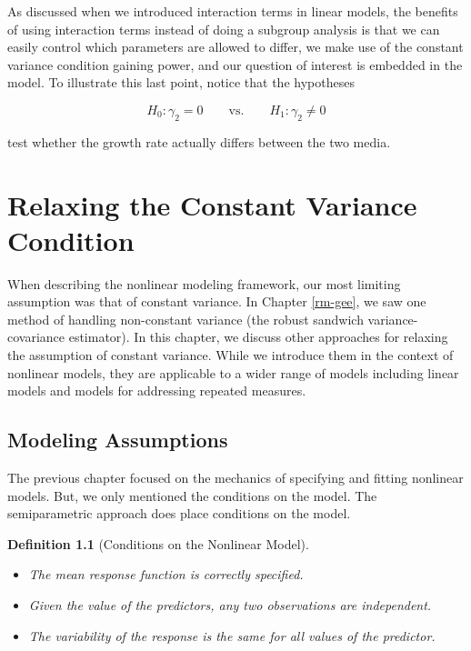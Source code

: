 \documentclass[
]{book}
\providecommand{\tightlist}{%
  \setlength{\itemsep}{0pt}\setlength{\parskip}{0pt}}
\theoremstyle{plain}
\theoremstyle{mydefn}
\newtheorem{definition}{Definition}[chapter]
\theoremstyle{myexmpl}
\theoremstyle{remark}
\begin{document}
As discussed when we introduced interaction terms in linear models, the benefits of using interaction terms instead of doing a subgroup analysis is that we can easily control which parameters are allowed to differ, we make use of the constant variance condition gaining power, and our question of interest is embedded in the model. To illustrate this last point, notice that the hypotheses

\[H_0: \gamma_2 = 0 \qquad \text{vs.} \qquad H_1: \gamma_2 \neq 0\]

test whether the growth rate actually differs between the two media.

\hypertarget{nlm-heteroskedasticity}{%
\chapter{Relaxing the Constant Variance Condition}\label{nlm-heteroskedasticity}}

When describing the nonlinear modeling framework, our most limiting assumption was that of constant variance. In Chapter \ref{rm-gee}, we saw one method of handling non-constant variance (the robust sandwich variance-covariance estimator). In this chapter, we discuss other approaches for relaxing the assumption of constant variance. While we introduce them in the context of nonlinear models, they are applicable to a wider range of models including linear models and models for addressing repeated measures.

\hypertarget{modeling-assumptions}{%
\section{Modeling Assumptions}\label{modeling-assumptions}}

The previous chapter focused on the mechanics of specifying and fitting nonlinear models. But, we only mentioned the conditions on the model. The semiparametric approach does place conditions on the model.

\begin{definition}[Conditions on the Nonlinear Model]

\begin{itemize}
\tightlist
\item
  The mean response function is correctly specified.
\item
  Given the value of the predictors, any two observations are independent.
\item
  The variability of the response is the same for all values of the predictor.
\end{itemize}

\end{definition}
\end{document}
